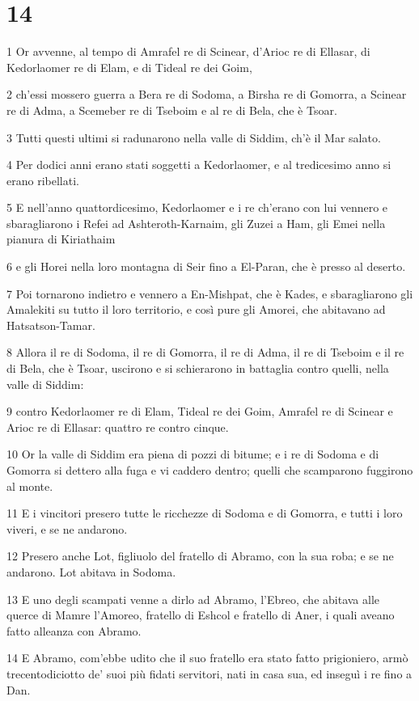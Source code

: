 \chapter{14}

\par 1 Or avvenne, al tempo di Amrafel re di Scinear, d'Arioc re di Ellasar, di Kedorlaomer re di Elam, e di Tideal re dei Goim,
\par 2 ch'essi mossero guerra a Bera re di Sodoma, a Birsha re di Gomorra, a Scinear re di Adma, a Scemeber re di Tseboim e al re di Bela, che è Tsoar.
\par 3 Tutti questi ultimi si radunarono nella valle di Siddim, ch'è il Mar salato.
\par 4 Per dodici anni erano stati soggetti a Kedorlaomer, e al tredicesimo anno si erano ribellati.
\par 5 E nell'anno quattordicesimo, Kedorlaomer e i re ch'erano con lui vennero e sbaragliarono i Refei ad Ashteroth-Karnaim, gli Zuzei a Ham, gli Emei nella pianura di Kiriathaim
\par 6 e gli Horei nella loro montagna di Seir fino a El-Paran, che è presso al deserto.
\par 7 Poi tornarono indietro e vennero a En-Mishpat, che è Kades, e sbaragliarono gli Amalekiti su tutto il loro territorio, e così pure gli Amorei, che abitavano ad Hatsatson-Tamar.
\par 8 Allora il re di Sodoma, il re di Gomorra, il re di Adma, il re di Tseboim e il re di Bela, che è Tsoar, uscirono e si schierarono in battaglia contro quelli, nella valle di Siddim:
\par 9 contro Kedorlaomer re di Elam, Tideal re dei Goim, Amrafel re di Scinear e Arioc re di Ellasar: quattro re contro cinque.
\par 10 Or la valle di Siddim era piena di pozzi di bitume; e i re di Sodoma e di Gomorra si dettero alla fuga e vi caddero dentro; quelli che scamparono fuggirono al monte.
\par 11 E i vincitori presero tutte le ricchezze di Sodoma e di Gomorra, e tutti i loro viveri, e se ne andarono.
\par 12 Presero anche Lot, figliuolo del fratello di Abramo, con la sua roba; e se ne andarono. Lot abitava in Sodoma.
\par 13 E uno degli scampati venne a dirlo ad Abramo, l'Ebreo, che abitava alle querce di Mamre l'Amoreo, fratello di Eshcol e fratello di Aner, i quali aveano fatto alleanza con Abramo.
\par 14 E Abramo, com'ebbe udito che il suo fratello era stato fatto prigioniero, armò trecentodiciotto de' suoi più fidati servitori, nati in casa sua, ed inseguì i re fino a Dan.
